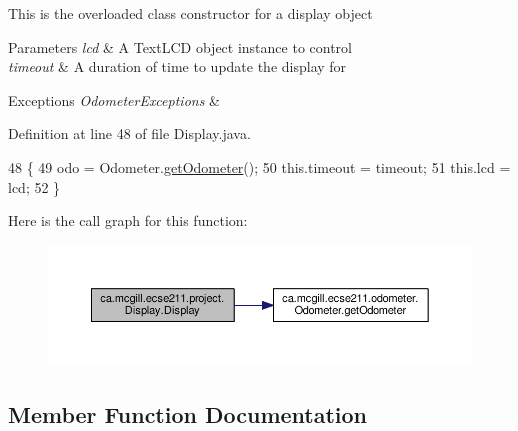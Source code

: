 This is the overloaded class constructor for a display object


\begin{DoxyParams}{Parameters}
{\em lcd} & A Text\+L\+CD object instance to control \\
\hline
{\em timeout} & A duration of time to update the display for \\
\hline
\end{DoxyParams}

\begin{DoxyExceptions}{Exceptions}
{\em Odometer\+Exceptions} & \\
\hline
\end{DoxyExceptions}


Definition at line 48 of file Display.\+java.


\begin{DoxyCode}
48                                                                       \{
49     odo = Odometer.\hyperlink{classca_1_1mcgill_1_1ecse211_1_1odometer_1_1_odometer_a99171f11e34dea918fa9dd069d721439}{getOdometer}();
50     this.timeout = timeout;
51     this.lcd = lcd;
52   \}
\end{DoxyCode}
Here is the call graph for this function\+:\nopagebreak
\begin{figure}[H]
\begin{center}
\leavevmode
\includegraphics[width=350pt]{classca_1_1mcgill_1_1ecse211_1_1project_1_1_display_a690cd91bcc8024950c2b8e3b2613c801_cgraph}
\end{center}
\end{figure}


\subsection{Member Function Documentation}
\mbox{\label{classca_1_1mcgill_1_1ecse211_1_1project_1_1_display_ab508a8bc2b738499bec2c432a814cba5}} 

